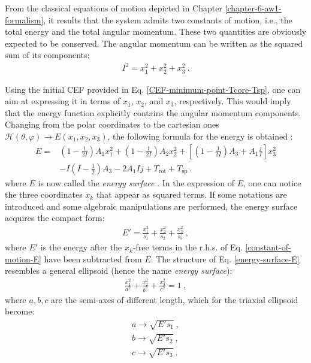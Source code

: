 From the classical equations of motion depicted in Chapter \ref{chapter-6-aw1-formalism}, it results that the system admits two constants of motion, i.e., the total energy and the total angular momentum. These two quantities are obviously expected to be conserved. The angular momentum can be written as the squared sum of its components:
\begin{align}
    I^2=x_1^2+x_2^2+x_3^2\ .
    \label{constant-of-motion-I}
\end{align}

Using the initial CEF provided in Eq. \ref{CEF-minimum-point-Tcore-Tsp}, one can aim at expressing it in terms of $x_1$, $x_2$, and $x_3$, respectively. This would imply that the energy function explicitly contains the angular momentum components. Changing from the polar coordinates to the cartesian ones $\mathcal{H}(\theta,\varphi)\longrightarrow E(x_1,x_2,x_3)$, the following formula for the energy is obtained \cite{poenaru2021extensive2}:
\begin{align}
    E=&\left(1-\frac{1}{2I}\right)A_1x_1^2+\left(1-\frac{1}{2I}\right)A_2x_2^2+\left[\left(1-\frac{1}{2I}\right)A_3+A_1\frac{j}{I}\right]x_3^2\nonumber\\
    &-I\left(I-\frac{1}{2}\right)A_3-2A_1Ij+T_\text{rot}+T_\text{sp}\ .
    \label{constant-of-motion-E}
\end{align}
where $E$ is now called the \emph{energy surface} \cite{poenaru2021extensive2}. In the expression of $E$, one can notice the three coordinates $x_k$ that appear as squared terms. If some notations are introduced and some algebraic manipulations are performed, the energy surface acquires the compact form:
\begin{align}
    E'=\frac{x_1^2}{s_1}+\frac{x_2^2}{s_2}+\frac{x_3^2}{s_3}\ ,
    \label{energy-surface-E}
\end{align}
where $E'$ is the energy after the $x_k$-free terms in the r.h.s. of Eq. \ref{constant-of-motion-E} have been subtracted from $E$. The structure of Eq. \ref{energy-surface-E} resembles a general ellipsoid (hence the name \emph{energy surface}):
\begin{align}
    \frac{x_1^2}{a^2}+\frac{x_2^2}{b^2}+\frac{x_3^2}{c^2}=1\ ,
\end{align}
where $a,b,c$ are the semi-axes of different length, which for the triaxial ellipsoid become:
\begin{align}
    a\to\sqrt{E's_1}\nonumber\ ,\\
    b\to\sqrt{E's_2}\nonumber\ ,\\
    c\to\sqrt{E's_3}\ .
    \label{semi-axes-lenghts-E}
\end{align}

